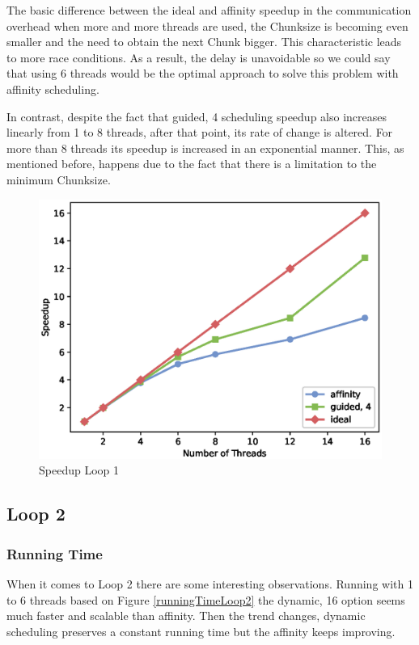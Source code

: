 \documentclass[12pt,a4paper]{article}
\begin{document}
The basic difference between the ideal and affinity speedup in the communication overhead when more and more threads are used, the Chunksize is becoming even smaller and the need to obtain the next Chunk bigger. This characteristic leads to more race conditions. As a result, the delay is unavoidable so we could say that using 6 threads would be the optimal approach to solve this problem with affinity scheduling.

In contrast, despite the fact that guided, 4 scheduling speedup also increases linearly from 1 to 8 threads, after that point, its rate of change is altered. For more than 8 threads its speedup is increased in an exponential manner. This, as mentioned before, happens due to the fact that there is a limitation to the minimum Chunksize.

\begin{figure}[ht]
    \centering
    \includegraphics[scale=0.6]{../graphs/loop1_speedup.eps}
    \caption{Speedup Loop 1}
    \label{speedupLoop1}
\end{figure}

\subsection{Loop 2}

\subsubsection{Running Time}

When it comes to Loop 2 there are some interesting observations. Running with 1 to 6 threads based on Figure \ref{runningTimeLoop2} the dynamic, 16 option seems much faster and scalable than affinity. Then the trend changes, dynamic scheduling preserves a constant running time but the affinity keeps improving.
\end{document}
